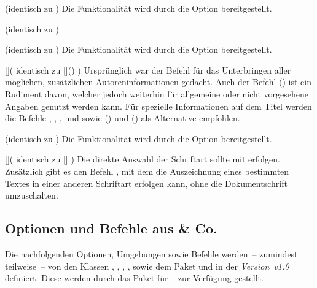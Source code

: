 \begin{Entity'}{}
\begin{Declaration}{}(identisch zu )
\printdeclarationlist%
%
Die Funktionalität wird durch die Option  bereitgestellt.
\end{Declaration}

\begin{Declaration}{}(identisch zu )
\begin{Declaration}{}(identisch zu )
\printdeclarationlist%
%
Die Funktionalität wird durch die Option  bereitgestellt.
\end{Declaration}
\end{Declaration}

\begin{Declaration}{[]}(%
  identisch zu []()%
)
\printdeclarationlist%
%
Ursprünglich war der Befehl für das Unterbringen aller möglichen, zusätzlichen 
Autoreninformationen gedacht. Auch der Befehl () ist ein 
Rudiment davon, welcher jedoch weiterhin für allgemeine oder nicht vorgesehene 
Angaben genutzt werden kann. Für spezielle Informationen auf dem Titel werden 
die Befehle , , , 
 und  sowie 
() und () als Alternative empfohlen.
\end{Declaration}

\begin{Declaration}{}(identisch zu )
\printdeclarationlist%
%
Die Funktionalität wird durch die Option  bereitgestellt.
\end{Declaration}

\begin{Declaration}{[]}(%
  identisch zu []%
)
\printdeclarationlist%
%
Die direkte Auswahl der Schriftart sollte mit  erfolgen. 
Zusätzlich gibt es den Befehl , mit dem die Auszeichnung 
eines bestimmten Textes in einer anderen Schriftart erfolgen kann, ohne die 
Dokumentschrift umzuschalten.
\end{Declaration}
%



\subsection{Optionen und Befehle aus  \& Co.}
%
Die nachfolgenden Optionen, Umgebungen sowie Befehle werden~-- zumindest 
teilweise~-- von den Klassen , , 
, ,  sowie dem Paket 
 und \TUDScript in der \emph{Version~v1.0} definiert. Diese 
werden durch das Paket  für \TUDScript~\vTUDScript{} zur 
Verfügung gestellt.


\end{Entity'}
